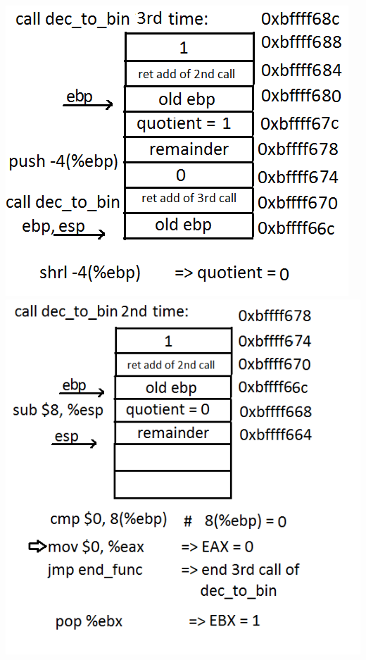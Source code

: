 \documentclass{article}
\begin{document}
\includegraphics[scale=0.5]{stack4.png}\\
\includegraphics[scale=0.5]{stack5.png}
\end{document}

